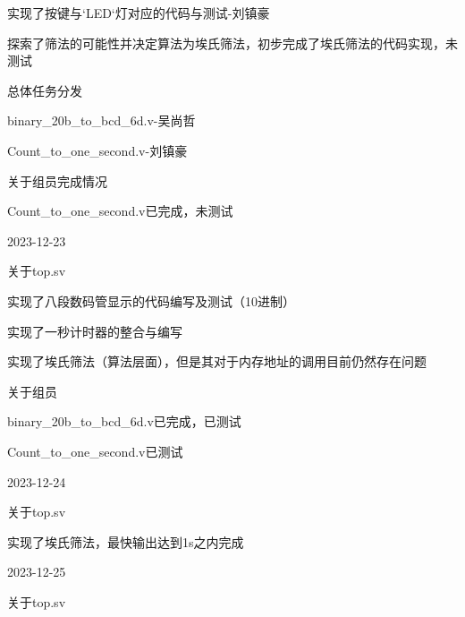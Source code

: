 \begin{compactitem}
\begin{compactitem}
\begin{compactitem}
			\item 实现了按键与`LED`灯对应的代码与测试-刘镇豪
			\item 探索了筛法的可能性并决定算法为埃氏筛法，初步完成了埃氏筛法的代码实现，未测试
		\end{compactitem}
		\item 总体任务分发
		\begin{compactitem}
			\item binary\_20b\_to\_bcd\_6d.v-吴尚哲
			\item Count\_to\_one\_second.v-刘镇豪
		\end{compactitem}
		\item 关于组员完成情况
		\begin{compactitem}
			\item Count\_to\_one\_second.v已完成，未测试
		\end{compactitem}
	\end{compactitem}
	\item 2023-12-23
	\begin{compactitem}
		\item 关于top.sv
		\begin{compactitem}
			\item 实现了八段数码管显示的代码编写及测试（10进制）
			\item 实现了一秒计时器的整合与编写
			\item 实现了埃氏筛法（算法层面），但是其对于内存地址的调用目前仍然存在问题
		\end{compactitem}
		\item 关于组员
		\begin{compactitem}
			\item binary\_20b\_to\_bcd\_6d.v已完成，已测试
			\item Count\_to\_one\_second.v已测试
		\end{compactitem}
	\end{compactitem}
	\item 2023-12-24
	\begin{compactitem}
		\item 关于top.sv
		\begin{compactitem}
			\item 实现了埃氏筛法，最快输出达到1s之内完成
		\end{compactitem}
	\end{compactitem}
	\item 2023-12-25
	\begin{compactitem}
		\item 关于top.sv
		\begin{compactitem}

\end{compactitem}
\end{compactitem}
\end{compactitem}
